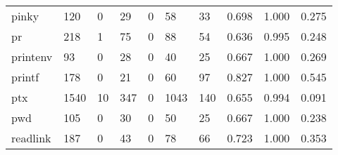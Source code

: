 \begin{longtable}{lp{1.3cm}p{1.3cm}p{1.3cm}p{1.3cm}p{1.3cm}p{1.3cm}p{1.3cm}p{1.3cm}p{1.3cm}}
pinky     &                    120 &                                  0 &                                29 &                                0 &                                58 &                              33 &                                0.698 &                                  1.000 &                                0.275 \\
pr        &                    218 &                                  1 &                                75 &                                0 &                                88 &                              54 &                                0.636 &                                  0.995 &                                0.248 \\
printenv  &                     93 &                                  0 &                                28 &                                0 &                                40 &                              25 &                                0.667 &                                  1.000 &                                0.269 \\
printf    &                    178 &                                  0 &                                21 &                                0 &                                60 &                              97 &                                0.827 &                                  1.000 &                                0.545 \\
ptx       &                   1540 &                                 10 &                               347 &                                0 &                              1043 &                             140 &                                0.655 &                                  0.994 &                                0.091 \\
pwd       &                    105 &                                  0 &                                30 &                                0 &                                50 &                              25 &                                0.667 &                                  1.000 &                                0.238 \\
readlink  &                    187 &                                  0 &                                43 &                                0 &                                78 &                              66 &                                0.723 &                                  1.000 &                                0.353 \\

\end{longtable}
